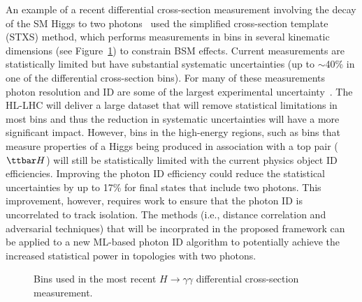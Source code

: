 \documentclass[letter, USenglish, 11pt, subfigure]{article}
\begin{document}
An example of a recent differential cross-section measurement involving the decay of the SM Higgs to two photons~\cite{ATLAS_STXS} used the simplified cross-section template (STXS) method, which performs measurements in bins in several kinematic dimensions (see Figure~\ref{fig:ggH_STXS}) to constrain BSM effects. Current measurements are statistically limited but have substantial systematic uncertainties (up to $\sim$40\% in one of the differential cross-section bins). For many of these measurements photon resolution and ID are some of the largest experimental uncertainty~\cite{ATLAS_STXS}. The HL-LHC will deliver a large dataset that will remove statistical limitations in most bins and thus the reduction in systematic uncertainties will have a more significant impact. However, bins in the high-energy regions, such as bins that measure properties of a Higgs being produced in association with a top pair ($\ttbar H$) will still be statistically limited with the current physics object ID efficiencies. Improving the photon ID efficiency could reduce the statistical uncertainties by up to 17\% for final states that include two photons. This improvement, however, requires work to ensure that the photon ID is uncorrelated to track isolation. The methods (i.e., distance correlation and adversarial techniques) that will be incorprated in 
the proposed framework can be applied to a new ML-based photon ID algorithm to potentially achieve the increased statistical power in topologies with two photons.

\begin{figure}[!htbp]  
  \centering
  \caption{\label{fig:ggH_STXS} Bins used in the most recent $H\to\gamma\gamma$ differential cross-section measurement.}
\end{figure}
\end{document}
